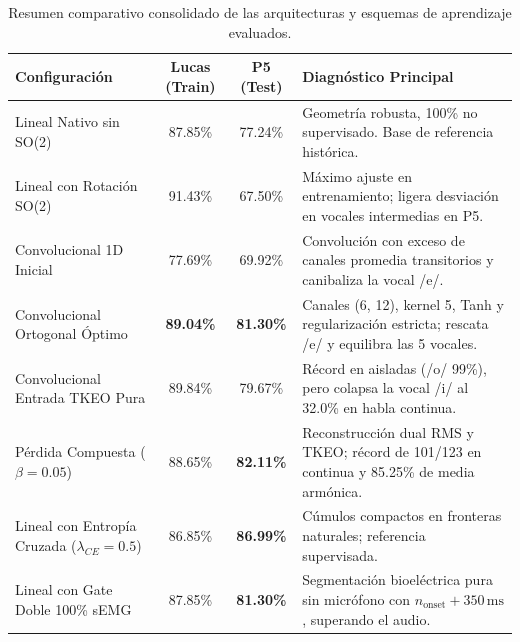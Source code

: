\documentclass[11pt,a4paper]{article}
\begin{document}
\begin{table}[H]
\centering
\begin{tabularx}{\textwidth}{p{4.5cm} c c X}
\toprule
\textbf{Configuración} & \textbf{Lucas (Train)} & \textbf{P5 (Test)} & \textbf{Diagnóstico Principal} \\
\midrule
Lineal Nativo sin SO(2) & 87.85\% & 77.24\% & Geometría robusta, 100\% no supervisado. Base de referencia histórica. \\
Lineal con Rotación SO(2) & 91.43\% & 67.50\% & Máximo ajuste en entrenamiento; ligera desviación en vocales intermedias en P5. \\
Convolucional 1D Inicial & 77.69\% & 69.92\% & Convolución con exceso de canales promedia transitorios y canibaliza la vocal /e/. \\
Convolucional Ortogonal Óptimo & \textbf{89.04\%} & \textbf{81.30\%} & Canales (6, 12), kernel 5, Tanh y regularización estricta; rescata /e/ y equilibra las 5 vocales. \\
Convolucional Entrada TKEO Pura & 89.84\% & 79.67\% & Récord en aisladas (/o/ 99\%), pero colapsa la vocal /i/ al 32.0\% en habla continua. \\
Pérdida Compuesta ($\beta = 0.05$) & 88.65\% & \textbf{82.11\%} & Reconstrucción dual RMS y TKEO; récord de 101/123 en continua y 85.25\% de media armónica. \\
Lineal con Entropía Cruzada ($\lambda_{CE}=0.5$) & 86.85\% & \textbf{86.99\%} & Cúmulos compactos en fronteras naturales; referencia supervisada. \\
Lineal con Gate Doble 100\% sEMG & 87.85\% & \textbf{81.30\%} & Segmentación bioeléctrica pura sin micrófono con $n_{\text{onset}} + 350\,\text{ms}$, superando el audio. \\
\bottomrule
\end{tabularx}
\caption{Resumen comparativo consolidado de las arquitecturas y esquemas de aprendizaje evaluados.}
\label{tab:resumen_final}
\end{table}
\end{document}
